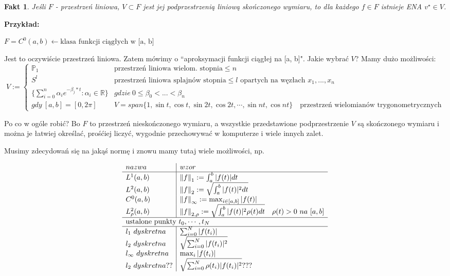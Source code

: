 \documentclass[hidelinks,a4paper,fleqn,oneside]{book}
\newcommand{\RR}{\mathbb{R}}
\newcommand{\la}{\leftarrow}
\newcommand{\norm}[1]{\left\lVert#1\right\rVert}
\newtheorem{fakt}{Fakt}
\begin{document}
\begin{fakt} Jeśli $F$ - przestrzeń liniowa, $V \subset F$ jest jej podprzestrzenią liniową skończonego wymiaru, to dla każdego $f \in F$ istnieje ENA $v^\star \in V$.\end{fakt}

\textbf{Przykład:}

$F = C^0(a, b) \la \textrm{klasa funkcji ciągłych w [a, b]}$

Jest to oczywiście przestrzeń liniowa. Zatem mówimy o ``aproksymacji funkcji ciągłej na [a, b]". Jakie wybrać $V$? Mamy dużo możliwości:
\[
	V := \left\{ \begin{array}{ll}
		\mathbb{P}_1 & \textrm{przestrzeń liniowa wielom. stopnia} \leq n \\
		S^l & \textrm{przestrzeń liniowa splajnów stopnia} \leq l\textrm{ opartych na węzłach }x_1, ..., x_n\\
		\{\sum_{i=0}^{n} \alpha_i e^{-\beta_j * t} : \alpha_i \in \RR\} & gdzie\ 0 \leq \beta_0 < ... < \beta_n \\
		gdy\ [a, b] = [0, 2\pi] & V = span\{1, \sin{t}, \cos{t}, \sin{2t}, \cos{2t}, \cdots, \sin{nt}, \cos{nt} \} \quad \textrm{przestrzeń wielomianów trygonometrycznych}
   \end{array}\right.
\]

Po co w ogóle robić? Bo $F$ to przestrzeń nieskończonego wymiaru, a wszystkie przedstawione podprzestrzenie $V$ są skończonego wymiaru i można je łatwiej określać, prośćiej liczyć, wygodnie przechowywać w komputerze i wiele innych zalet.

Musimy zdecydowań się na jakąś normę i znowu mamy tutaj wiele możliwości, np.

\[
	\begin{array}{l|l}
		nazwa & wzor \\ \hline
		L^1(a, b) & \norm{f}_1 := \int_a^b |f(t)| dt \\
		L^2(a, b) & \norm{f}_2 := \sqrt{\int_a^b |f(t)|^2 dt} \\
		C^0(a, b) & \norm{f}_\infty := \max_{i \in [a, b]} |f(t)| \\
		L^2_\rho(a, b) & \norm{f}_{2, \rho} := \sqrt{\int_a^b |f(t)|^2 \rho(t) dt} \quad \rho(t) > 0\ na\ [a, b] \\ \hline
		\multicolumn{2}{l}{\textrm{ustalone punkty }t_0, \cdots, t_N} \\ \hline
		l_1\ dyskretna & \sum_{i=0}^N |f(t_i)| \\
		l_2\ dyskretna & \sqrt{\sum_{i=0}^N |f(t_i)|^2} \\
		l_\infty\ dyskretna & \max_{i} |f(t_i)| \\
		l_2\ dyskretna ?? & \sqrt{\sum_{i=0}^N \rho(t_i) |f(t_i)|^2} ???
	\end{array}
\]
\end{document}
